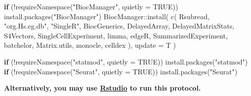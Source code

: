 \documentclass[
  openany]{book}
\newenvironment{Shaded}{\begin{snugshade}}{\end{snugshade}}
\newcommand{\AttributeTok}[1]{\textcolor[rgb]{0.77,0.63,0.00}{#1}}
\newcommand{\ConstantTok}[1]{\textcolor[rgb]{0.00,0.00,0.00}{#1}}
\newcommand{\ControlFlowTok}[1]{\textcolor[rgb]{0.13,0.29,0.53}{\textbf{#1}}}
\newcommand{\FunctionTok}[1]{\textcolor[rgb]{0.00,0.00,0.00}{#1}}
\newcommand{\NormalTok}[1]{#1}
\newcommand{\SpecialCharTok}[1]{\textcolor[rgb]{0.00,0.00,0.00}{#1}}
\newcommand{\StringTok}[1]{\textcolor[rgb]{0.31,0.60,0.02}{#1}}
\begin{document}
\begin{Shaded}
\begin{Highlighting}[]
\ControlFlowTok{if}\NormalTok{ (}\SpecialCharTok{!}\FunctionTok{requireNamespace}\NormalTok{(}\StringTok{"BiocManager"}\NormalTok{, }\AttributeTok{quietly =} \ConstantTok{TRUE}\NormalTok{))}
  \FunctionTok{install.packages}\NormalTok{(}\StringTok{"BiocManager"}\NormalTok{)}
\NormalTok{BiocManager}\SpecialCharTok{::}\FunctionTok{install}\NormalTok{(}
  \FunctionTok{c}\NormalTok{(}
    \StringTok{\textquotesingle{}Rsubread\textquotesingle{}}\NormalTok{,}
    \StringTok{"org.Hs.eg.db"}\NormalTok{,}
    \StringTok{"SingleR"}\NormalTok{,}
    \StringTok{\textquotesingle{}BiocGenerics\textquotesingle{}}\NormalTok{,}
    \StringTok{\textquotesingle{}DelayedArray\textquotesingle{}}\NormalTok{,}
    \StringTok{\textquotesingle{}DelayedMatrixStats\textquotesingle{}}\NormalTok{,}
    \StringTok{\textquotesingle{}S4Vectors\textquotesingle{}}\NormalTok{,}
    \StringTok{\textquotesingle{}SingleCellExperiment\textquotesingle{}}\NormalTok{,}
    \StringTok{\textquotesingle{}limma\textquotesingle{}}\NormalTok{,}
    \StringTok{\textquotesingle{}edgeR\textquotesingle{}}\NormalTok{,}
    \StringTok{\textquotesingle{}SummarizedExperiment\textquotesingle{}}\NormalTok{,}
    \StringTok{\textquotesingle{}batchelor\textquotesingle{}}\NormalTok{,}
    \StringTok{\textquotesingle{}Matrix.utils\textquotesingle{}}\NormalTok{,}
    \StringTok{\textquotesingle{}monocle\textquotesingle{}}\NormalTok{,}
    \StringTok{\textquotesingle{}celldex\textquotesingle{}}
\NormalTok{  ),}
  \AttributeTok{update =}\NormalTok{ T}
\NormalTok{)}

\ControlFlowTok{if}\NormalTok{ (}\SpecialCharTok{!}\FunctionTok{requireNamespace}\NormalTok{(}\StringTok{"statmod"}\NormalTok{, }\AttributeTok{quietly =} \ConstantTok{TRUE}\NormalTok{))}
  \FunctionTok{install.packages}\NormalTok{(}\StringTok{"statmod"}\NormalTok{)}
\ControlFlowTok{if}\NormalTok{ (}\SpecialCharTok{!}\FunctionTok{requireNamespace}\NormalTok{(}\StringTok{"Seurat"}\NormalTok{, }\AttributeTok{quietly =} \ConstantTok{TRUE}\NormalTok{))}
  \FunctionTok{install.packages}\NormalTok{(}\StringTok{"Seurat"}\NormalTok{)}
\end{Highlighting}
\end{Shaded}

\textbf{Alternatively, you may use \href{https://rstudio.com/}{Rstudio} to run this protocol.}

\vspace{-100pt}
\end{document}
